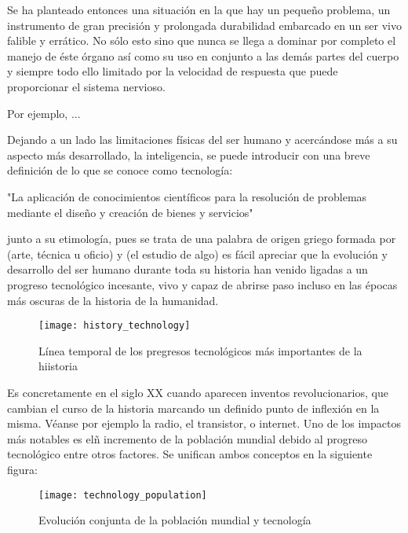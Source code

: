 
Se ha planteado entonces una situación en la que hay un pequeño problema, un instrumento de gran precisión y prolongada durabilidad embarcado en un ser vivo falible y errático. No sólo esto sino que nunca se llega a dominar por completo el manejo de éste órgano así como su uso en conjunto a las demás partes del cuerpo y siempre todo ello limitado por la velocidad de respuesta que puede proporcionar el sistema nervioso.

Por ejemplo, ...

Dejando a un lado las limitaciones físicas del ser humano y acercándose más a su aspecto más desarrollado, la inteligencia, se puede introducir  con una breve definición de lo que se conoce como tecnología:

"La aplicación de conocimientos científicos para la resolución de problemas mediante el diseño y creación de bienes y servicios" 

junto a su etimología, pues se trata de una palabra de origen griego 
formada por 
(arte, técnica u oficio) y 
(el estudio de algo) es fácil apreciar que la evolución y desarrollo del ser humano durante toda su historia han venido ligadas a un progreso tecnológico incesante, vivo y capaz de abrirse paso incluso en las épocas más oscuras de la historia de la humanidad. 

\begin{figure}[!htb]
\centering
{}
  \texttt{[image: history\_technology]}
  \caption{Línea temporal de los pregresos tecnológicos más importantes de la hiistoria}\label{fig:history_technology}
\endminipage\hfill
\end{figure}

Es concretamente en el siglo XX cuando aparecen inventos revolucionarios, que cambian el curso de la historia marcando un definido punto de inflexión en la misma. Véanse por ejemplo la radio, el transistor, o internet. Uno de los impactos más notables es elñ incremento de la población mundial debido al progreso tecnológico entre otros factores. Se unifican ambos conceptos en la siguiente figura:

\begin{figure}[!htb]
\centering
{}
  \texttt{[image: technology\_population]}
  \caption{Evolución conjunta de la población mundial y tecnología}\label{fig:technology_population}
\endminipage\hfill
\end{figure}

